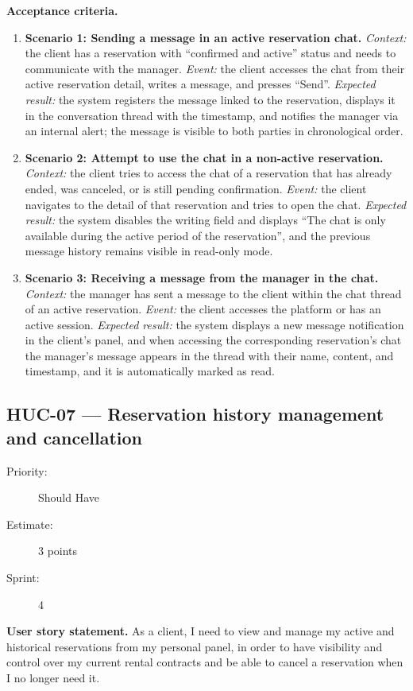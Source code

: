 \documentclass[11pt,a4paper,oneside]{report}
\begin{document}
\textbf{Acceptance criteria.}
\begin{enumerate}
\item \textbf{Scenario 1: Sending a message in an active reservation chat.} \emph{Context:} the client has a reservation with ``confirmed and active'' status and needs to communicate with the manager. \emph{Event:} the client accesses the chat from their active reservation detail, writes a message, and presses ``Send''. \emph{Expected result:} the system registers the message linked to the reservation, displays it in the conversation thread with the timestamp, and notifies the manager via an internal alert; the message is visible to both parties in chronological order.
\item \textbf{Scenario 2: Attempt to use the chat in a non-active reservation.} \emph{Context:} the client tries to access the chat of a reservation that has already ended, was canceled, or is still pending confirmation. \emph{Event:} the client navigates to the detail of that reservation and tries to open the chat. \emph{Expected result:} the system disables the writing field and displays ``The chat is only available during the active period of the reservation'', and the previous message history remains visible in read-only mode.
\item \textbf{Scenario 3: Receiving a message from the manager in the chat.} \emph{Context:} the manager has sent a message to the client within the chat thread of an active reservation. \emph{Event:} the client accesses the platform or has an active session. \emph{Expected result:} the system displays a new message notification in the client's panel, and when accessing the corresponding reservation's chat the manager's message appears in the thread with their name, content, and timestamp, and it is automatically marked as read.
\end{enumerate}

\subsection{HUC-07 --- Reservation history management and cancellation}
\label{req:HUC-07}
\begin{description}
\item[Priority:] Should Have \quad \item[Estimate:] 3 points \quad \item[Sprint:] 4
\end{description}

\textbf{User story statement.} As a client, I need to view and manage my active and historical reservations from my personal panel, in order to have visibility and control over my current rental contracts and be able to cancel a reservation when I no longer need it.
\end{document}
